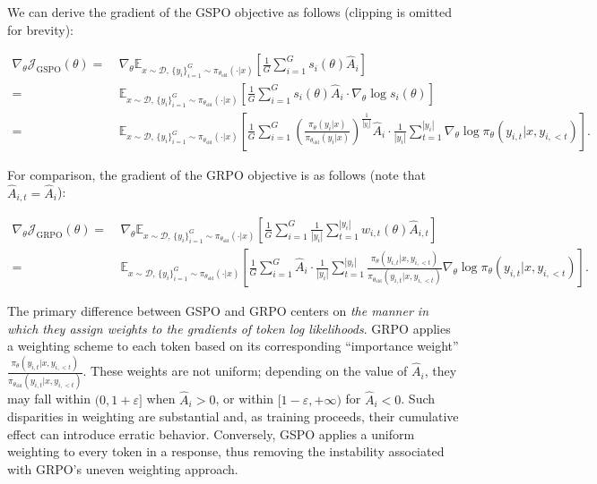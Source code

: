 We can derive the gradient of the GSPO objective as follows (clipping is omitted for brevity):

\begin{align}
\nabla_{\theta} \mathcal{J}_\text{GSPO} (\theta)
=&\ 
\nabla_{\theta} \mathbb{E}_{ x \sim \mathcal{D},\, \{y_i\}_{i=1}^G \sim \pi_{\theta_\text{old}}( \cdot | x) }
\left[ 
\frac{1}{G} \sum_{i=1}^{G} s_{i}(\theta) \widehat{A}_{i}
\right] \\
= &\ 
\mathbb{E}_{ x \sim \mathcal{D},\, \{y_i\}_{i=1}^G \sim \pi_{\theta_\text{old}}( \cdot | x) }
\left[ 
\frac{1}{G} \sum_{i=1}^{G}
s_{i}(\theta) \widehat{A}_{i}
\cdot \nabla_{\theta} \log s_{i}(\theta)
\right] \\
=&\ 
\mathbb{E}_{ x \sim \mathcal{D},\, \{y_i\}_{i=1}^G \sim \pi_{\theta_\text{old}}( \cdot | x) }
\left[ 
\frac{1}{G} \sum_{i=1}^{G} 
\left( \frac{ \pi_{\theta} (y_i | x) }{ \pi_{\theta_\text{old}} (y_i | x)} \right)^{\frac{1}{|y_i|}} \widehat{A}_{i} 
\cdot \frac{1}{|y_i|} \sum_{t=1}^{|y_i|} \nabla_{\theta} \log \pi_{\theta} (y_{i,t} | x, y_{i,<t}) 
\right].
\label{equ:gspo_grad}
\end{align}

For comparison, the gradient of the GRPO objective is as follows (note that $\widehat{A}_{i,t} = \widehat{A}_{i}$):

\begin{align}
\nabla_{\theta} \mathcal{J}_\text{GRPO} (\theta) 
=&\ 
\nabla_{\theta} \mathbb{E}_{ x \sim \mathcal{D},\, \{y_i\}_{i=1}^G \sim \pi_{\theta_\text{old}}( \cdot | x) }
\left[ \frac{1}{G} \sum_{i=1}^{G} \frac{1}{|y_i|} \sum_{t=1}^{|y_i|} 
w_{i,t}(\theta) \widehat{A}_{i,t}
\right] \\
=&\
\mathbb{E}_{ x \sim \mathcal{D},\, \{y_i\}_{i=1}^G \sim \pi_{\theta_\text{old}}( \cdot | x) }
\left[ \frac{1}{G} \sum_{i=1}^{G} \widehat{A}_{i} 
\cdot \frac{1}{|y_i|} \sum_{t=1}^{|y_i|} 
\frac{ \pi_{\theta} (y_{i,t} | x, y_{i,<t}) }{ \pi_{\theta_\text{old}} (y_{i,t} | x,y_{i,<t})} 
\nabla_{\theta} \log \pi_{\theta} (y_{i,t} | x, y_{i,<t})  
\right].
\end{align}

The primary difference between GSPO and GRPO centers on \textit{the manner in which they assign weights to the gradients of token log likelihoods}. GRPO applies a weighting scheme to each token based on its corresponding ``importance weight'' $\frac{ \pi_{\theta} (y_{i,t} | x, y_{i,<t}) }{ \pi_{\theta_\text{old}} (y_{i,t} | x,y_{i,<t})}$. These weights are not uniform; depending on the value of $\widehat{A}_i$, they may fall within $(0, 1+\varepsilon]$ when $\widehat{A}_i > 0$, or within $[1-\varepsilon, +\infty)$ for $\widehat{A}_i < 0$. Such disparities in weighting are substantial and, as training proceeds, their cumulative effect can introduce erratic behavior. Conversely, GSPO applies a uniform weighting to every token in a response, thus removing the instability associated with GRPO’s uneven weighting approach.


